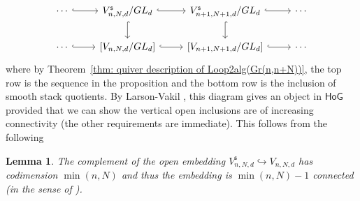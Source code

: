 \message{ !name(Bryan-Vakil.tex)}\documentclass{amsart}
\newtheorem{lemma}[theorem]{Lemma}
\theoremstyle{definition}
\newcommand{\HoG}{\textsf{HoG}}
\newcommand{\stable}{\mathsf{s}}
\begin{document}
\begin{equation} \label{eqn: HoG diagram for Loop2(d,BU)}
\begin{tikzcd}
    \cdots \arrow[r, hook]
    & V^{\stable}_{n,N,d}/GL_{d} \arrow[r, hook] \arrow[d, hook]
    & V^{\stable}_{n+1,N+1,d}/GL_{d}  \arrow[r, hook] \arrow[d, hook] & \cdots \\
    \cdots \arrow[r, hook]
    & \left[V_{n,N,d}/GL_{d} \right] \arrow[r, hook]
    & \left[V_{n+1,N+1,d}/GL_{d} \right] 
\arrow[r, hook] & \cdots
\end{tikzcd}
\end{equation}
where by Theorem~\ref{thm: quiver description of Loop2alg(Gr(n,n+N))},
the top row is the sequence in the proposition and the bottom row is
the inclusion of smooth stack quotients. By Larson-Vakil
\cite[Definition 3.1]{Larson-Vakil-BottPeriodicity}, this diagram
gives an object in $\HoG$ provided that we can show the vertical open
inclusions are of increasing connectivity (the other requirements are
immediate). This follows from the following
\begin{lemma}\label{lem: codimension of unstable locus for the Gr quiver}
The complement of the open embedding
$V^{\stable}_{n,N,d}\hookrightarrow V_{n,N,d}$ has codimension $\min
(n,N)$ and thus the embedding is $\min(n,N)-1$ \emph{connected} (in
the sense of \cite[Definition~2.1]{Larson-Vakil-BottPeriodicity}).
\end{lemma}
\end{document}
